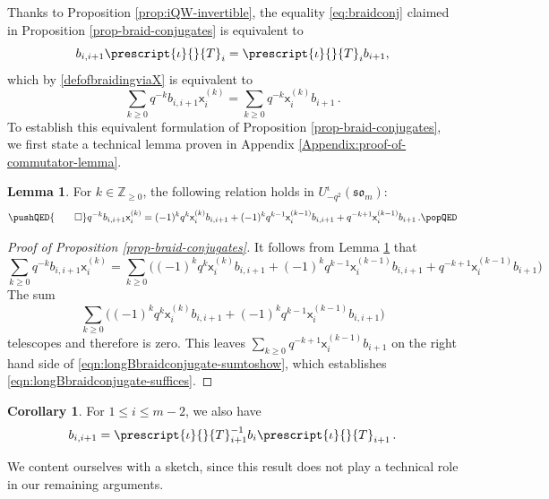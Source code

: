 \documentclass[10pt]{amsart}
\numberwithin{equation}{section}
\theoremstyle{definition}
\newtheorem{cor}[thm]{Corollary}
\newtheorem{lem}[thm]{Lemma}
\newcommand{\som}[1][m]{\mathfrak{so}_{#1}}
\newcommand{\iqUsom}[1][m]{{U}^{\iota}_{-q^2}(\som[#1])}
\newcommand{\iQW}{\prescript{\iota}{}{T}}
\newcommand{\xxb}{\mathsf{x}}
\begin{document}
Thanks to Proposition \ref{prop:iQW-invertible}, 
the equality \eqref{eq:braidconj} claimed in Proposition \ref{prop-braid-conjugates} is equivalent to 
\[
b_{i,i+1}\iQW_i = \iQW_{i}b_{i+1}, 
\]
which by \eqref{defofbraidingviaX} is equivalent to
\begin{equation}\label{eqn:longBbraidconjugate-suffices}
\sum_{k\ge 0}q^{-k}b_{i,i+1}\xxb_{i}^{(k)} = \sum_{k \ge 0}q^{-k}\xxb_{i}^{(k)} b_{i+1} \, .
\end{equation}
To establish this equivalent formulation of Proposition \ref{prop-braid-conjugates}, 
we first state a technical lemma proven in Appendix \ref{Appendix:proof-of-commutator-lemma}.

\begin{lem}\label{lem:techcomm}
For $k\in \mathbb{Z}_{\ge 0}$, the following relation holds in $\iqUsom$:
\[
\pushQED{\qed} 
q^{-k}b_{i,i+1}\xxb_{i}^{(k)} = (-1)^kq^{k}\xxb_{i}^{(k)}b_{i,i+1} 
	+(-1)^kq^{k-1}\xxb_i^{(k-1)}b_{i,i+1} + q^{-k+1}\xxb_i^{(k-1)}b_{i+1} \, . 
\qedhere \popQED
	\]
\end{lem}

\begin{proof}[Proof of Proposition \ref{prop-braid-conjugates}]
It follows from Lemma \ref{lem:techcomm} that
\begin{equation}\label{eqn:longBbraidconjugate-sumtoshow}
\sum_{k\ge 0}q^{-k}b_{i,i+1}\xxb_{i}^{(k)} 
= \sum_{k\ge 0}\bigg((-1)^kq^{k}\xxb_{i}^{(k)}b_{i,i+1} +(-1)^kq^{k-1}\xxb_i^{(k-1)}b_{i,i+1} + q^{-k+1}\xxb_i^{(k-1)}b_{i+1}\bigg)
\end{equation}
The sum 
\[
\sum_{k\ge 0}\bigg((-1)^kq^{k}\xxb_{i}^{(k)}b_{i,i+1} +(-1)^kq^{k-1}\xxb_i^{(k-1)}b_{i,i+1}\bigg)
\]
telescopes and therefore is zero. 
This leaves $\sum_{k \ge 0}q^{-k+1}\xxb_i^{(k-1)}b_{i+1}$ 
on the right hand side of \eqref{eqn:longBbraidconjugate-sumtoshow}, 
which establishes \eqref{eqn:longBbraidconjugate-suffices}.
\end{proof}

\begin{cor}
For $1 \leq i \leq m-2$, we also have
\begin{equation}\label{eqn:braid-conj-both}
b_{i,i+1} = \iQW_{i+1}^{-1}b_{i}\iQW_{i+1} \, .
\end{equation}
\end{cor}

We content ourselves with a sketch, 
since this result does not play a technical role in our remaining arguments.
\end{document}
